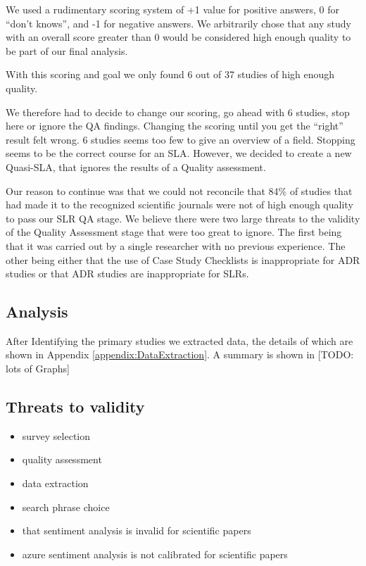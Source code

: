 We used a rudimentary scoring system of +1 value for positive answers, 0 for ``don't knows'', and -1 for negative answers.
We arbitrarily chose that any study with an overall score greater than 0 would be considered high enough quality to be part of our final analysis.

With this scoring and goal we only found 6 out of 37 studies of high enough quality.

We therefore had to decide to change our scoring, go ahead with 6 studies, stop here or ignore the QA findings.
Changing the scoring until you get the ``right'' result felt wrong.
6 studies seems too few to give an overview of a field.
Stopping seems to be the correct course for an SLA.
However, we decided to create a new Quasi-SLA, that ignores the results of a Quality assessment.

Our reason to continue was that we could not reconcile that 84\% of studies that had made it to the recognized scientific journals were not of high enough quality to pass our SLR QA stage.
We believe there were two large threats to the validity of the Quality Assessment stage that were too great to ignore.
The first being that it was carried out by a single researcher with no previous experience.
The other being either that the use of Case Study Checklists is inappropriate for ADR studies or that ADR studies are inappropriate for SLRs.


\subsection{Analysis}
After Identifying the primary studies we extracted data, the details of which are shown in Appendix \ref{appendix:DataExtraction}.
A summary is shown in 
[TODO: lots of Graphs]

\subsection{Threats to validity}

\begin{itemize}
    \item survey selection
    \item quality assessment
    \item data extraction
    \item search phrase choice
    \item that sentiment analysis is invalid for scientific papers
    \item azure sentiment analysis is not calibrated for scientific papers
\end{itemize}
 